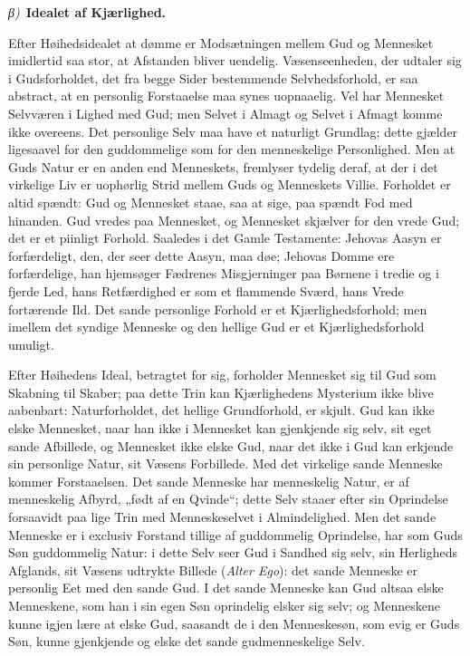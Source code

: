 \documentclass[12pt]{book}
\newcommand{\greekrun}[2]{%
  \medskip\begin{center}{\itshape #1)}\ {\bfseries #2}\end{center}\medskip}
\begin{document}
\greekrun{β}{Idealet af Kjærlighed.}

Efter Høihedsidealet at dømme er Modsætningen mellem Gud og
Mennesket imidlertid saa stor, at Afstanden bliver uendelig.
Væsenseenheden, der udtaler sig i Gudsforholdet, det fra begge Sider
bestemmende Selvhedsforhold, er saa abstract, at en personlig
Forstaaelse maa synes uopnaaelig. Vel har Mennesket Selvværen i
Lighed med Gud; men Selvet i Almagt og Selvet i Afmagt komme ikke
overeens. Det personlige Selv maa have et
naturligt Grundlag; dette gjælder ligesaavel for den guddommelige
som for den menneskelige Personlighed. Men at Guds Natur er en anden
end Menneskets, fremlyser tydelig deraf, at der i det virkelige Liv
er uophørlig Strid mellem Guds og Menneskets Villie. Forholdet er
altid spændt: Gud og Mennesket staae, saa at sige, paa spændt Fod
med hinanden. Gud vredes paa Mennesket, og Mennesket skjælver for
den vrede Gud; det er et piinligt Forhold. Saaledes i det Gamle
Testamente: Jehovas Aasyn er forfærdeligt, den, der seer dette
Aasyn, maa døe; Jehovas Domme ere forfærdelige, han hjemsøger
Fædrenes Misgjerninger paa Børnene i tredie og i fjerde Led, hans
Retfærdighed er som et flammende Sværd, hans Vrede fortærende Ild.
Det sande personlige Forhold er et Kjærlighedsforhold; men imellem
det syndige Menneske og den hellige Gud er et Kjærlighedsforhold
umuligt.

Efter Høihedens Ideal, betragtet for sig, forholder Mennesket sig
til Gud som Skabning til Skaber; paa dette Trin kan Kjærlighedens
Mysterium ikke blive aabenbart: Naturforholdet, det hellige
Grundforhold, er skjult. Gud kan ikke elske Mennesket, naar han ikke
i Mennesket kan gjenkjende sig selv, sit eget sande Afbillede, og
Mennesket ikke elske Gud, naar det ikke i Gud kan erkjende sin
personlige Natur, sit Væsens Forbillede. Med det virkelige sande
Menneske kommer Forstaaelsen. Det sande Menneske har menneskelig
Natur, er af menneskelig Afbyrd, „født af en Qvinde“; dette Selv
staaer efter sin Oprindelse forsaavidt paa lige Trin med
Menneskeselvet i Almindelighed. Men det sande Menneske er i exclusiv
Forstand tillige af guddommelig Oprindelse, har som Guds Søn
guddommelig Natur: i dette Selv seer Gud i Sandhed sig selv, sin
Herligheds Afglands, sit Væsens udtrykte Billede (\textit{Alter
Ego}): det sande Menneske er personlig Eet med den sande Gud.
I det sande Menneske kan Gud altsaa elske Menneskene, som han i sin
egen Søn oprindelig elsker sig selv; og Menneskene kunne igjen lære
at elske Gud, saasandt de i den Menneskesøn, som evig er Guds Søn,
kunne gjenkjende og elske det sande gudmenneskelige Selv.
\end{document}
